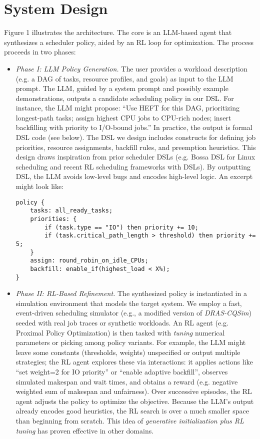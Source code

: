 \section{\sys{} System Design}

Figure 1 illustrates the \sys{} architecture. The core is an LLM-based agent that synthesizes a scheduler policy, aided by an RL loop for optimization. The process proceeds in two phases:

\begin{itemize}
\item \emph{Phase I: LLM Policy Generation.} The user provides a workload description (e.g. a DAG of tasks, resource profiles, and goals) as input to the LLM prompt. The LLM, guided by a system prompt and possibly example demonstrations, outputs a candidate scheduling policy in our DSL. For instance, the LLM might propose: ``Use HEFT for this DAG, prioritizing longest-path tasks; assign highest CPU jobs to CPU-rich nodes; insert backfilling with priority to I/O-bound jobs.'' In practice, the output is formal DSL code (see below). The DSL we design includes constructs for defining job priorities, resource assignments, backfill rules, and preemption heuristics. This design draws inspiration from prior scheduler DSLs (e.g. Bossa DSL for Linux scheduling and recent RL scheduling frameworks with DSLs). By outputting DSL, the LLM avoids low-level bugs and encodes high-level logic. An excerpt might look like:

\begin{verbatim}
policy {
    tasks: all_ready_tasks;
    priorities: {
        if (task.type == "IO") then priority += 10;
        if (task.critical_path_length > threshold) then priority += 5;
    }
    assign: round_robin_on_idle_CPUs;
    backfill: enable_if(highest_load < X%);
}
\end{verbatim}

\item \emph{Phase II: RL-Based Refinement.} The synthesized policy is instantiated in a simulation environment that models the target system. We employ a fast, event-driven scheduling simulator (e.g., a modified version of \emph{DRAS-CQSim}) seeded with real job traces or synthetic workloads. An RL agent (e.g. Proximal Policy Optimization) is then tasked with \emph{tuning} numerical parameters or picking among policy variants. For example, the LLM might leave some constants (thresholds, weights) unspecified or output multiple strategies; the RL agent explores these via interactions: it applies actions like ``set weight=2 for IO priority'' or ``enable adaptive backfill'', observes simulated makespan and wait times, and obtains a reward (e.g. negative weighted sum of makespan and unfairness). Over successive episodes, the RL agent adjusts the policy to optimize the objective. Because the LLM's output already encodes good heuristics, the RL search is over a much smaller space than beginning from scratch. This idea of \emph{generative initialization plus RL tuning} has proven effective in other domains.
\end{itemize}

